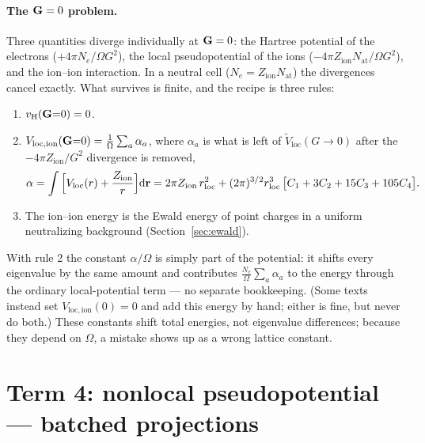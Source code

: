 \paragraph{The $\mathbf{G} = 0$ problem.}
\label{sec:g0}
Three quantities diverge individually at $\mathbf{G} = 0$: the Hartree potential of
the electrons ($+4\pi N_e / \Omega G^2$), the local pseudopotential of the
ions ($-4\pi Z_{\mathrm{ion}} N_{\mathrm{at}} / \Omega G^2$), and the
ion--ion interaction. In a neutral cell ($N_e = Z_{\mathrm{ion}}
N_{\mathrm{at}}$) the divergences cancel exactly. What survives is finite, and the recipe is three rules:
\begin{enumerate}[leftmargin=2em]
\item $v_{\mathrm{H}}(\mathbf{G}{=}0) = 0$.
\item $V_{\mathrm{loc,ion}}(\mathbf{G}{=}0) = \frac{1}{\Omega}\sum_a \alpha_a$,
where $\alpha_a$ is what is left of $\tilde V_{\mathrm{loc}}(G\to0)$ after
the $-4\pi Z_{\mathrm{ion}}/G^2$ divergence is removed,
\begin{equation}
\alpha = \int \Big[V_{\mathrm{loc}}(r) + \frac{Z_{\mathrm{ion}}}{r}\Big]
\mathrm{d}\mathbf{r}
= 2\pi Z_{\mathrm{ion}}\, r_{\mathrm{loc}}^2
+ (2\pi)^{3/2} r_{\mathrm{loc}}^3\,
\big[C_1 + 3C_2 + 15C_3 + 105C_4\big].
\label{eq:alphaZ}
\end{equation}
\item The ion--ion energy is the Ewald energy of point charges in a uniform
neutralizing background (Section~\ref{sec:ewald}).
\end{enumerate}
With rule 2 the constant $\alpha/\Omega$ is simply part of the potential:
it shifts every eigenvalue by the same amount and contributes
$\frac{N_e}{\Omega}\sum_a\alpha_a$ to the energy through the ordinary
local-potential term --- no separate bookkeeping. (Some texts instead set
$V_{\mathrm{loc,ion}}(0) = 0$ and add this energy by hand; either is fine,
but never do both.) These constants shift total energies, not eigenvalue
differences; because they depend on $\Omega$, a mistake shows up as a wrong
lattice constant.

\section{Term 4: nonlocal pseudopotential --- batched projections}

